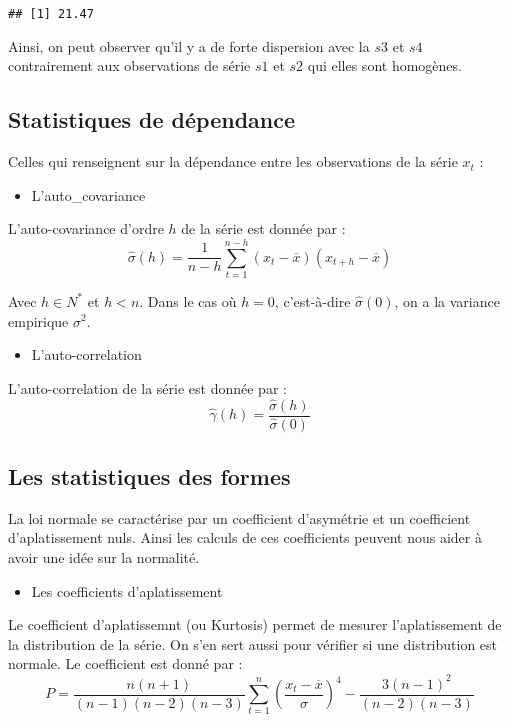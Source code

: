 \documentclass[
]{book}
\providecommand{\tightlist}{%
  \setlength{\itemsep}{0pt}\setlength{\parskip}{0pt}}
\theoremstyle{definition}
\theoremstyle{definition}
\theoremstyle{definition}
\theoremstyle{definition}
\theoremstyle{remark}
\begin{document}
\begin{verbatim}
## [1] 21.47
\end{verbatim}

Ainsi, on peut observer qu'il y a de forte dispersion avec la \(s3\) et \(s4\) contrairement aux observations de série \(s1\) et \(s2\) qui elles sont homogènes.

\hypertarget{statistiques-de-duxe9pendance}{%
\subsection{Statistiques de dépendance}\label{statistiques-de-duxe9pendance}}

Celles qui renseignent sur la dépendance entre les observations de la série \(x_t\) :

\begin{itemize}
\tightlist
\item
  L'auto\_covariance
\end{itemize}

L'auto-covariance d'ordre \(h\) de la série est donnée par :
\[\hat\sigma(h) = \frac{1}{n-h} \sum_{t=1}^{n-h} (x_{t} - \overline{x}) (x_{t+h} - \overline{x})\]

Avec \(h \in N^*\) et \(h < n\). Dans le cas où \(h=0\), c'est-à-dire \(\hat\sigma(0)\), on a la variance empirique \(\sigma^2\).

\begin{itemize}
\tightlist
\item
  L'auto-correlation
\end{itemize}

L'auto-correlation de la série est donnée par :
\[\hat\gamma(h) = \frac{\hat\sigma(h)}{\hat\sigma(0)}\]

\hypertarget{les-statistiques-des-formes}{%
\subsection{Les statistiques des formes}\label{les-statistiques-des-formes}}

La loi normale se caractérise par un coefficient d'asymétrie et un coefficient d'aplatissement nuls. Ainsi les calculs de ces coefficients peuvent nous aider à avoir une idée sur la normalité.

\begin{itemize}
\tightlist
\item
  Les coefficients d'aplatissement
\end{itemize}

Le coefficient d'aplatissemnt (ou Kurtosis) permet de mesurer l'aplatissement de la distribution de la série. On s'en sert aussi pour vérifier si une distribution est normale. Le coefficient est donné par :
\[P = \frac{n(n+1)}{(n-1)(n-2)(n-3)} \sum_{t=1}^n \left( \frac{x_t - \overline{x}}{\sigma} \right)^4 - \frac{3(n-1)^2}{(n-2)(n-3)} \]
\end{document}
